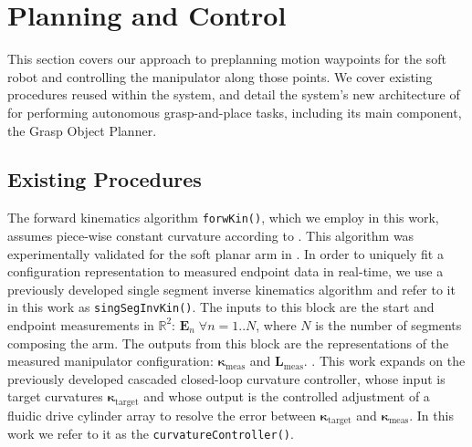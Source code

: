 \section{Planning and Control}
\label{sec:processing_and_control}
This section covers our approach to preplanning motion waypoints for the soft robot and controlling the manipulator along those points. We cover existing procedures reused within the system, and detail the system's new architecture of for performing autonomous grasp-and-place tasks, including its main component, the Grasp Object Planner.

\subsection{Existing Procedures}
The forward kinematics algorithm \texttt{forwKin()}, which we employ in this work, assumes piece-wise constant curvature according to \cite{webster2010design}. 
This algorithm was experimentally validated for the soft planar arm in \cite{marchese2014design}.
In order to uniquely fit a configuration representation to measured endpoint data in real-time, we use a previously developed single segment inverse kinematics algorithm \cite{marchese2014design} and refer to it in this work as \texttt{singSegInvKin()}.
The inputs to this block are the start and endpoint measurements in $\mathbb{R}^2$: $\mathbf{E}_n \; \forall n  = 1..N$, where $N$ is the number of segments composing the arm.
The outputs from this block are the representations of the measured manipulator configuration: $\boldsymbol{\kappa}_{\textrm{meas}}$ and $\mathbf{L}_{\textrm{meas}}$.
.
This work expands on the previously developed cascaded closed-loop curvature controller, whose input is target curvatures $\boldsymbol{\kappa}_{\textrm{target}}$ and whose output is the controlled adjustment of a fluidic drive cylinder array to resolve the error between $\boldsymbol{\kappa}_{\textrm{target}}$ and $\boldsymbol{\kappa}_{\textrm{meas}}$.
In this work we refer to it as the \texttt{curvatureController()}.


